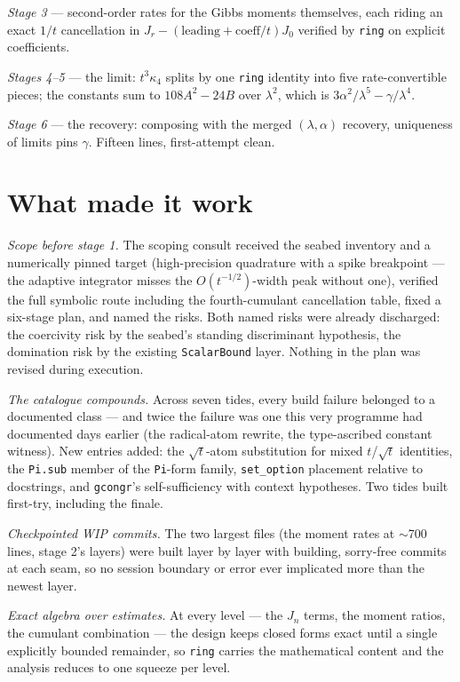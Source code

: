 \documentclass[11pt]{article}
\begin{document}
\emph{Stage 3} --- second-order rates for the Gibbs moments themselves,
each riding an exact $1/t$ cancellation in
$J_r - (\text{leading} + \text{coeff}/t)J_0$ verified by \texttt{ring}
on explicit coefficients.

\emph{Stages 4--5} --- the limit: $t^3\kappa_4$ splits by one
\texttt{ring} identity into five rate-convertible pieces; the constants
sum to $108A^2 - 24B$ over $\lambda^2$, which is
$3\alpha^2/\lambda^5 - \gamma/\lambda^4$.

\emph{Stage 6} --- the recovery: composing with the merged
$(\lambda, \alpha)$ recovery, uniqueness of limits pins $\gamma$.
Fifteen lines, first-attempt clean.

\section{What made it work}

\emph{Scope before stage 1.} The scoping consult received the seabed
inventory and a numerically pinned target (high-precision quadrature
with a spike breakpoint --- the adaptive integrator misses the
$O(t^{-1/2})$-width peak without one), verified the full symbolic route
including the fourth-cumulant cancellation table, fixed a six-stage
plan, and named the risks. Both named risks were already discharged:
the coercivity risk by the seabed's standing discriminant hypothesis,
the domination risk by the existing \texttt{ScalarBound} layer. Nothing
in the plan was revised during execution.

\emph{The catalogue compounds.} Across seven tides, every build failure
belonged to a documented class --- and twice the failure was one this
very programme had documented days earlier (the radical-atom rewrite,
the type-ascribed constant witness). New entries added: the
$\sqrt t$-atom substitution for mixed $t$/$\sqrt t$ identities, the
\texttt{Pi.sub} member of the \texttt{Pi}-form family,
\texttt{set\_option} placement relative to docstrings, and
\texttt{gcongr}'s self-sufficiency with context hypotheses. Two tides
built first-try, including the finale.

\emph{Checkpointed WIP commits.} The two largest files (the moment
rates at $\sim$700 lines, stage 2's layers) were built layer by layer
with building, sorry-free commits at each seam, so no session boundary
or error ever implicated more than the newest layer.

\emph{Exact algebra over estimates.} At every level --- the $J_n$
terms, the moment ratios, the cumulant combination --- the design keeps
closed forms exact until a single explicitly bounded remainder, so
\texttt{ring} carries the mathematical content and the analysis reduces
to one squeeze per level.
\end{document}
